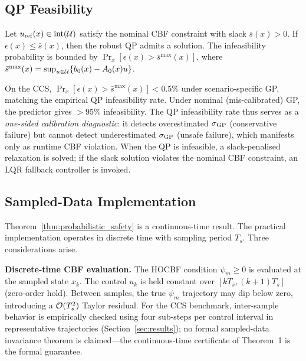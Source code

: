 \subsection{QP Feasibility}

\begin{proposition}
\label{prop:qp_feasibility}
Let $u_{\mathrm{ref}}(x) \in \mathrm{int}(\mathcal{U})$ satisfy the nominal CBF constraint with slack $\bar{s}(x) > 0$. If $\epsilon(x) \leq \bar{s}(x)$, then the robust QP admits a solution. The infeasibility probability is bounded by $\Pr_x[\epsilon(x) > \bar{s}^{\max}(x)]$, where $\bar{s}^{\max}(x) = \sup_{u \in \mathcal{U}}\{b_0(x) - A_0(x)u\}$.
\end{proposition}

On the CCS, $\Pr_x[\epsilon(x) > \bar{s}^{\max}(x)] < 0.5\%$ under scenario-specific GP, matching the empirical QP infeasibility rate. Under nominal (mis-calibrated) GP, the predictor gives $>95\%$ infeasibility. The QP infeasibility rate thus serves as a \emph{one-sided calibration diagnostic}: it detects overestimated $\sigma_{\mathrm{GP}}$ (conservative failure) but cannot detect underestimated $\sigma_{\mathrm{GP}}$ (unsafe failure), which manifests only as runtime CBF violation. When the QP is infeasible, a slack-penalised relaxation is solved; if the slack solution violates the nominal CBF constraint, an LQR fallback controller is invoked.

\subsection{Sampled-Data Implementation}
\label{subsec:sampled_data}

Theorem~\ref{thm:probabilistic_safety} is a continuous-time result. The practical implementation operates in discrete time with sampling period $T_s$. Three considerations arise.

\textbf{Discrete-time CBF evaluation.} The HOCBF condition $\psi_m \geq 0$ is evaluated at the sampled state $x_k$. The control $u_k$ is held constant over $[kT_s, (k+1)T_s]$ (zero-order hold). Between samples, the true $\psi_m$ trajectory may dip below zero, introducing a $\mathcal{O}(T_s^2)$ Taylor residual. For the CCS benchmark, inter-sample behavior is empirically checked using four sub-steps per control interval in representative trajectories (Section~\ref{sec:results}); no formal sampled-data invariance theorem is claimed---the continuous-time certificate of Theorem~1 is the formal guarantee.

